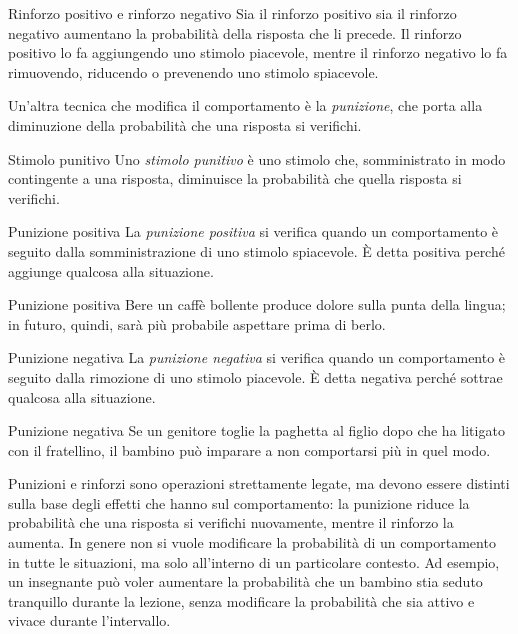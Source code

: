 \documentclass[a4paper]{article}
\begin{document}
\begin{snippetnote}{Rinforzo positivo e rinforzo negativo}
    Sia il rinforzo positivo sia il rinforzo negativo aumentano la probabilità della risposta che li precede. Il rinforzo positivo lo fa aggiungendo uno stimolo piacevole, mentre il rinforzo negativo lo fa rimuovendo, riducendo o prevenendo uno stimolo spiacevole.
\end{snippetnote}
Un'altra tecnica che modifica il comportamento è la \emph{punizione}, che porta alla diminuzione della probabilità che una risposta si verifichi.
\begin{snippetdefinition}{Stimolo punitivo}
    Uno \emph{stimolo punitivo} è uno stimolo che, somministrato in modo contingente a una risposta, diminuisce la probabilità che quella risposta si verifichi.
\end{snippetdefinition}
\begin{snippetdefinition}{Punizione positiva}
    La \emph{punizione positiva} si verifica quando un comportamento è seguito dalla somministrazione di uno stimolo spiacevole. È detta positiva perché aggiunge qualcosa alla situazione.
\end{snippetdefinition}
\begin{snippetexample}{Punizione positiva}
    Bere un caffè bollente produce dolore sulla punta della lingua; in futuro, quindi, sarà più probabile aspettare prima di berlo.
\end{snippetexample}
\begin{snippetdefinition}{Punizione negativa}
    La \emph{punizione negativa} si verifica quando un comportamento è seguito dalla rimozione di uno stimolo piacevole. È detta negativa perché sottrae qualcosa alla situazione.
\end{snippetdefinition}
\begin{snippetexample}{Punizione negativa}
    Se un genitore toglie la paghetta al figlio dopo che ha litigato con il fratellino, il bambino può imparare a non comportarsi più in quel modo.
\end{snippetexample}
Punizioni e rinforzi sono operazioni strettamente legate, ma devono essere distinti sulla base degli effetti che hanno sul comportamento: la punizione riduce la probabilità che una risposta si verifichi nuovamente, mentre il rinforzo la aumenta.
In genere non si vuole modificare la probabilità di un comportamento in tutte le situazioni, ma solo all'interno di un particolare contesto. Ad esempio, un insegnante può voler aumentare la probabilità che un bambino stia seduto tranquillo durante la lezione, senza modificare la probabilità che sia attivo e vivace durante l'intervallo.
\end{document}
